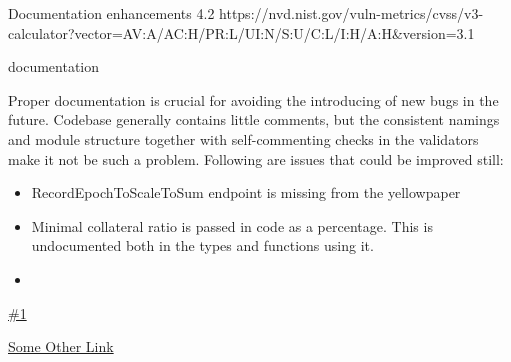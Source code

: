 \vuln
    { %
      Documentation enhancements
    }
    { %
      4.2
    }
    { %
      https://nvd.nist.gov/vuln-metrics/cvss/v3-calculator?vector=AV:A/AC:H/PR:L/UI:N/S:U/C:L/I:H/A:H&version=3.1
    }
    { %
    \item documentation
    }
    { %
    Proper documentation is crucial for avoiding the introducing of new bugs in the future.
Codebase generally contains little comments, but the consistent namings and module structure together with self-commenting checks in the validators make it not be such a problem.
Following are issues that could be improved still:
\begin{itemize}
    \item RecordEpochToScaleToSum endpoint is missing from the yellowpaper
    \item Minimal collateral ratio is passed in code as a percentage. This is undocumented both in the types and functions using it. 
    \item 
  \end{itemize}
  
    }
    { %
      
    }
    { %
    \item\href{github.com}{\#1}
    \item\href{github.com}{Some Other Link}
    }

